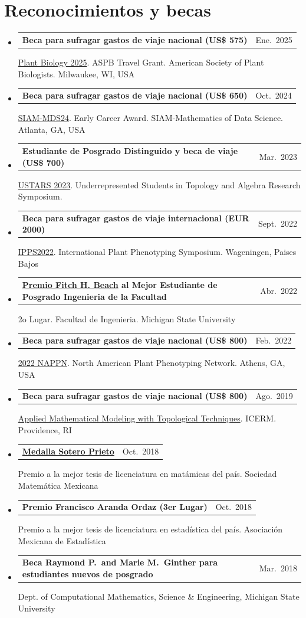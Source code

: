 \documentclass[A4,11pt]{article}
\makeatletter
\newcommand{\CVQubheading}[3]{
	\vspace{-0.5ex}\item
	\begin{tabular*}{0.97\textwidth}[t]{l@{\extracolsep{\fill}}r}
		\textbf{#1} & #2 \\
	\end{tabular*}
   {\small #3}\vspace{-0.5ex}
}
\newcommand{\CVSubHeadingListStart}{\begin{itemize}[leftmargin=0.5cm, label={}]}
\newcommand{\CVSubHeadingListEnd}{\end{itemize}}
\makeatother
\begin{document}
		\section{Reconocimientos y becas}
		\CVSubHeadingListStart
		\CVQubheading
		{Beca para sufragar gastos de viaje nacional (US\$ 575)}{Ene.~2025}
		{\hyperref{https://plantbiology.aspb.org/}{}{}{Plant Biology 2025}. ASPB Travel Grant. American Society of Plant Biologists. Milwaukee, WI, USA}
		\CVQubheading
		{Beca para sufragar gastos de viaje nacional (US\$ 650)}{Oct.~2024}
		{\hyperref{https://www.siam.org/conferences-events/siam-conferences/mds24/}{}{}{SIAM-MDS24}. Early Career Award. SIAM-Mathematics of Data Science. Atlanta, GA, USA}
		\CVQubheading
		{Estudiante de Posgrado Distinguido y beca de viaje (US\$ 700)}{Mar.~2023}
		{\hyperref{https://www.ustars.org/}{}{}{USTARS 2023}. Underrepresented Students in Topology and Algebra Research Symposium.}
		\CVQubheading
		{Beca para sufragar gastos de viaje internacional (EUR 2000)}{Sept.~2022}
		{\hyperref{https://www.plant-phenotyping.org/ipps7}{}{}{IPPS2022}. International Plant Phenotyping Symposium. Wageningen, Paises Bajos}
		\CVQubheading
		{\hyperref{https://www.egr.msu.edu/graduate/fitch-h-beach-awards}{}{}{Premio Fitch H. Beach} al Mejor Estudiante de Posgrado Ingenieria de la Facultad}{Abr.~2022}
		{2o Lugar. Facultad de Ingenieria. Michigan State University}
		\CVQubheading
		{Beca para sufragar gastos de viaje nacional (US\$ 800)}{Feb.~2022}
		{\hyperref{https://www.plantphenotyping.org/conference-home}{}{}{2022 NAPPN}. North American Plant Phenotyping Network. Athens, GA, USA}
		\CVQubheading
		{Beca para sufragar gastos de viaje nacional (US\$ 800)}{Ago.~2019}
		{\hyperref{https://icerm.brown.edu/topical\_workshops/tw19-6-ammtt/}{}{}{Applied Mathematical Modeling with Topological Techniques}. ICERM. Providence, RI}
		\CVQubheading
		{\hyperref{https://www.smm.org.mx/premio-sotero-prieto/2018}{}{}{Medalla Sotero Prieto}}{Oct.~2018}
		{Premio a la mejor tesis de licenciatura en mat\'amicas del pa\'is. Sociedad Matem\'atica Mexicana}
		\CVQubheading
		{Premio Francisco Aranda Ordaz (3er Lugar)}{Oct.~2018}
		{Premio a la mejor tesis de licenciatura en estad\'istica del pa\'is. Asociaci\'on Mexicana de Estad\'istica}
		\CVQubheading
		{Beca Raymond P.~and Marie M.~Ginther para estudiantes nuevos de posgrado}{Mar.~2018}
		{Dept. of Computational Mathematics, Science \& Engineering, Michigan State University}
		\CVSubHeadingListEnd
		
		
		
		
	

		
	
\end{document}
